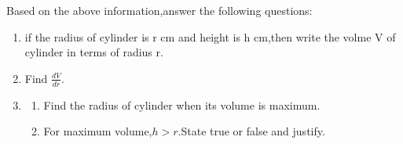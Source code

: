 \begin{enumerate}
		Based on the above information,answer the following questions:\\
		
			\begin{enumerate}
				\item if the radius of cylinder is r cm and height is h cm,then write the volme V of cylinder in terms of radius r.
					
				\item Find $ \frac{dV}{dr} $.
					
				\item \begin{enumerate}
						\item Find the radius of cylinder when its volume is maximum.
			
		\item For maximum volume,$h>r$.State true or false and justify.
				
			
				\end{enumerate}
			\end{enumerate}
\end{enumerate}
